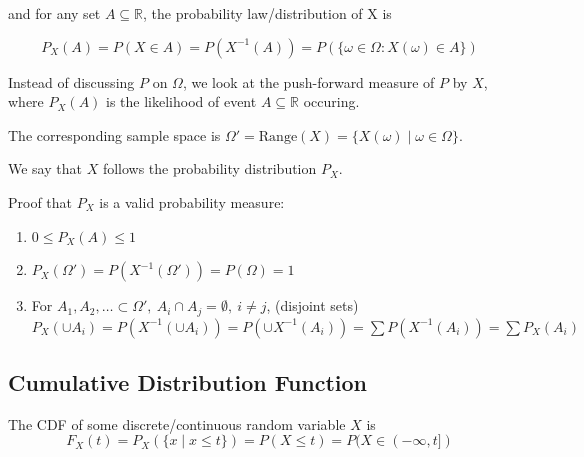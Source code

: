 \documentclass[../Probability.tex]{subfiles}
\begin{document}
\noindent and for any set $A \subseteq \mathbb{R}$, the probability law/distribution of X is

\[P_X(A) = P(X\in A) = P(X^{-1}(A)) = P(\{\omega\in\Omega: X(\omega)\in A\})\]

\noindent Instead of discussing $P$ on $\Omega$, we look at the push-forward measure
of $P$ by $X$, where $P_X(A)$ is the likelihood of event $A\subseteq\mathbb{R}$ occuring.

\noindent The corresponding sample space is $\Omega' = \text{Range}(X) = \{X(\omega)\mid \omega\in\Omega\}$.

\noindent We say that $X$ follows the probability distribution $P_X$.

\medskip

\noindent Proof that $P_X$ is a valid probability measure:
\begin{enumerate}
    \item $0\leq P_X(A)\leq 1$
    \item $P_X(\Omega') = P(X^{-1}(\Omega')) = P(\Omega) = 1$
    \item For $A_1, A_2,\ldots\subset\Omega',\: A_i\cap A_j=\emptyset,\:i\neq j$, (disjoint sets)\newline 
    $P_X(\cup A_i) = P(X^{-1}(\cup A_{i})) = P(\cup X^{-1}(A_i))
    = \sum P(X^{-1}(A_i)) = \sum P_X(A_i)$
\end{enumerate}

\subsection{Cumulative Distribution Function}
The CDF of some discrete/continuous random variable $X$ is
\[F_X(t) = P_X(\{x\mid x\leq t\}) = P(X\leq t) = P(X\in (-\infty,t])\]
\end{document}
